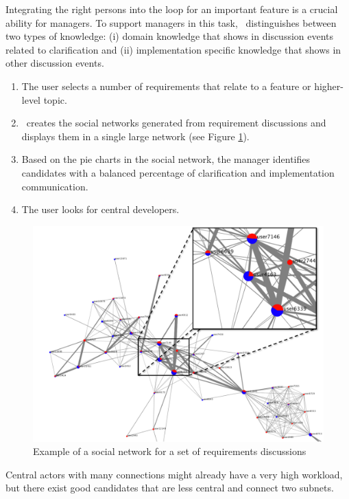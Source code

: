Integrating the right persons into the loop for an important feature is a crucial ability for managers.
To support managers in this task, \viss\ distinguishes between two types of knowledge: (i) domain knowledge that shows in discussion events related to clarification and (ii) implementation specific knowledge that shows in other discussion events.
\begin{enumerate}
\item The user selects a number of requirements that relate to a feature or higher-level topic. 
\item \viss\ creates the social networks generated from requirement discussions and displays them in a single large network (see Figure \ref{fig:example-sn-large}).
\item Based on the pie charts in the social network, the manager identifies candidates with a balanced percentage of clarification and implementation communication.
\item The user looks for central developers. 
\end{enumerate}
\begin{figure}
\centering
\includegraphics[width=0.8\columnwidth]{img/example-sn-large}
\caption{Example of a social network for a set of requirements discussions}
\label{fig:example-sn-large}
\end{figure}
Central actors with many connections might already have a very high workload, but there exist good candidates that are less central and connect two subnets.
